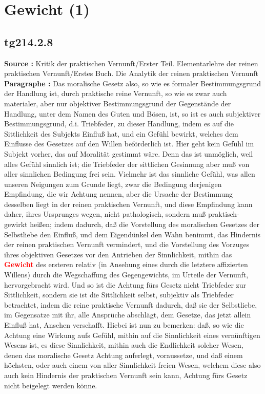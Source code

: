 \documentclass[a4paper,12pt,twoside]{book}
\newcommand{\match}[1]{\textcolor{red}{\textbf{#1}}}
\newcommand{\unnumberedsection}[1]{
	\section*{#1}
	\addcontentsline{toc}{section}{#1}
	\markright{#1}
}
\begin{document}
	\unnumberedsection{Gewicht (1)} 
	\subsection*{tg214.2.8} 
	\textbf{Source : }Kritik der praktischen Vernunft/Erster Teil. Elementarlehre der reinen praktischen Vernunft/Erstes Buch. Die Analytik der reinen praktischen Vernunft\\  
	
	\textbf{Paragraphe : }
	Das moralische Gesetz also, so wie es formaler Bestimmungsgrund der Handlung ist, durch praktische reine Vernunft, so wie es zwar auch materialer, aber nur objektiver Bestimmungsgrund der Gegenstände der Handlung, unter dem Namen des Guten und Bösen, ist, so ist es auch subjektiver Bestimmungsgrund, d.i. Triebfeder, zu dieser Handlung, indem es auf die Sittlichkeit des Subjekts Einfluß hat, und ein Gefühl bewirkt, welches dem Einflusse des Gesetzes auf den Willen beförderlich ist. Hier geht kein Gefühl im Subjekt vorher, das auf Moralität gestimmt wäre. Denn das ist unmöglich, weil alles Gefühl sinnlich ist; die Triebfeder der sittlichen Gesinnung aber muß von aller sinnlichen Bedingung frei sein. Vielmehr ist das sinnliche Gefühl, was allen unseren Neigungen zum Grunde liegt, zwar die Bedingung derjenigen Empfindung, die wir Achtung nennen, aber die Ursache der Bestimmung desselben liegt in der reinen praktischen Vernunft, und diese Empfindung kann daher, ihres Ursprunges wegen, nicht pathologisch, sondern muß praktisch-gewirkt heißen; indem dadurch, daß die Vorstellung des moralischen Gesetzes der Selbstliebe den Einfluß, und dem Eigendünkel den Wahn benimmt, das Hindernis der reinen praktischen Vernunft vermindert, und die Vorstellung des Vorzuges ihres objektiven Gesetzes vor den Antrieben der Sinnlichkeit, mithin das \match{Gewicht} des ersteren relativ (in Ansehung eines durch die letztere affizierten Willens) durch die Wegschaffung des Gegengewichts, im Urteile der Vernunft, hervorgebracht wird. Und so ist die Achtung fürs Gesetz nicht Triebfeder zur Sittlichkeit, sondern sie ist die Sittlichkeit selbst, subjektiv als Triebfeder betrachtet, indem die reine praktische Vernunft dadurch, daß sie der Selbstliebe, im Gegensatze mit ihr, alle Ansprüche abschlägt, dem Gesetze, das jetzt allein Einfluß hat, Ansehen verschafft. Hiebei ist nun zu bemerken: daß, so wie die Achtung eine Wirkung aufs Gefühl, mithin auf die Sinnlichkeit eines vernünftigen Wesens ist, es diese Sinnlichkeit, mithin auch die Endlichkeit solcher Wesen, denen das moralische Gesetz Achtung auferlegt, voraussetze, und  daß einem höchsten, oder auch einem von aller Sinnlichkeit freien Wesen, welchem diese also auch kein Hindernis der praktischen Vernunft sein kann, Achtung fürs Gesetz nicht beigelegt werden könne. 
	
\end{document}
